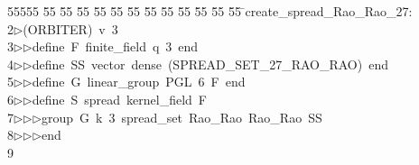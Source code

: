 %
%
\begin{tabbing}
55555 \= 55 \= 55 \= 55 \= 55 \= 55 \= 55 \= 55 \= 55 \= 55 \= 55 \= 55 \= 55 \= \>create\_spread\_Rao\_Rao\_27:\\[0pt]
2\>$\triangleright$\>(ORBITER)\ v\ 3\ \\[0pt]
3\>$\triangleright$\>$\triangleright$\>define\ F\ finite\_field\ q\ 3\ end\ \\[0pt]
4\>$\triangleright$\>$\triangleright$\>define\ SS\ vector\ dense\ (SPREAD\_SET\_27\_RAO\_RAO)\ end\ \\[0pt]
5\>$\triangleright$\>$\triangleright$\>define\ G\ linear\_group\ PGL\ 6\ F\ end\ \\[0pt]
6\>$\triangleright$\>$\triangleright$\>define\ S\ spread\ kernel\_field\ F\ \\[0pt]
7\>$\triangleright$\>$\triangleright$\>$\triangleright$\>group\ G\ k\ 3\ spread\_set\ Rao\_Rao\ Rao\_Rao\ SS\ \\[0pt]
8\>$\triangleright$\>$\triangleright$\>$\triangleright$\>end\\[0pt]
9\>\end{tabbing}
